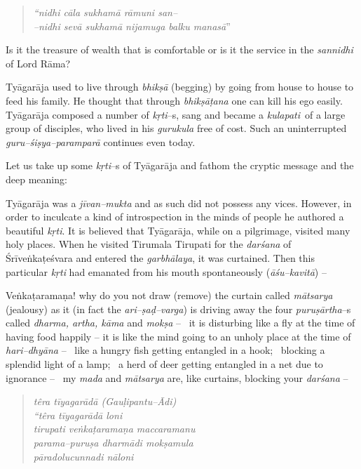 \begin{verse}
\textit{“nidhi cāla sukhamā rāmuni san–}\\\textit{–nidhi sevā sukhamā nijamuga balku manasā}”
\end{verse}

Is it the treasure of wealth that is comfortable or is it the service in the \textit{sannidhi} of Lord Rāma?

Tyāgarāja used to live through \textit{bhikṣā} (begging) by going from house to house to feed his family. He thought that through \textit{bhikṣāṭana} one can kill his ego easily. Tyāgarāja composed a number of \textit{kṛti}–s, sang and became a \textit{kulapati} of a large group of disciples, who lived in his \textit{gurukula} free of cost. Such an uninterrupted \textit{guru–śiṣya–paramparā} continues even today. 

Let us take up some \textit{kṛti}–s of Tyāgarāja and fathom the cryptic message and the deep meaning: 

Tyāgarāja was a \textit{jīvan–mukta} and as such did not possess any vices. However, in order to inculcate a kind of introspection in the minds of people he authored a beautiful \textit{kṛti}. It is believed that Tyāgarāja, while on a pilgrimage, visited many holy places. When he visited Tirumala Tirupati for the \textit{darśana} of Śrīveṅkaṭeśvara and entered the \textit{garbhālaya}, it was curtained. Then this particular \textit{kṛti} had emanated from his mouth spontaneously (\textit{āśu–kavitā}) –

Veṅkaṭaramaṇa! why do you not draw (remove) the curtain called \textit{mātsarya} (jealousy) as it (in fact the \textit{ari–ṣaḍ–varga}) is driving away the four \textit{puruṣārtha}–s called \textit{dharma, artha, kāma} and \textit{mokṣa} –  it is disturbing like a fly at the time of having food happily – it is like the mind going to an unholy place at the time of \textit{hari–dhyāna} –  like a hungry fish getting entangled in a hook;  blocking a splendid light of a lamp;  a herd of deer getting entangled in a net due to ignorance –  my \textit{mada} and \textit{mātsarya} are, like curtains, blocking your \textit{darśana} –  

\begin{verse}
\textit{têra tīyagarādā (Gauḷipantu–Ādi)}\\\textit{“têra tīyagarādā loni}\\\textit{tirupati veṅkaṭaramaṇa maccaramanu}\\\textit{parama–puruṣa dharmādi mokṣamula}\\\textit{pāradolucunnadi nāloni}
\end{verse}

